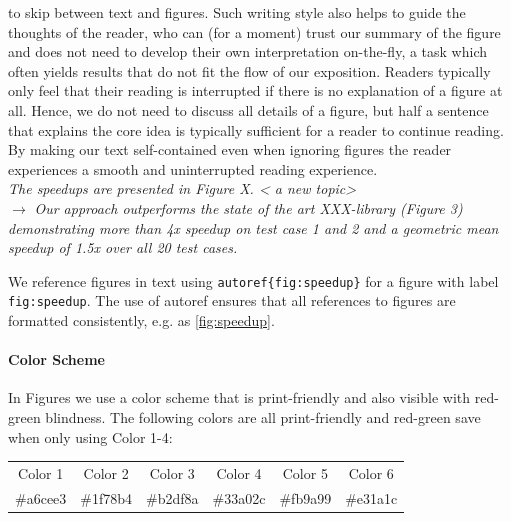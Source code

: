 \documentclass[conference]{IEEEtran}
\newenvironment{draftonly}{}{}
\begin{document}
\begin{draftonly}
\begin{description}
		to skip between text and figures. Such writing style also helps
		to guide the thoughts of the reader, who can (for a moment)
		trust our summary of the figure and does not need to develop
		their own interpretation on-the-fly, a task which often yields
		results that do not fit the flow of our exposition. Readers
		typically only feel that their reading is interrupted if there
		is no explanation of a figure at all. Hence, we do not need to
		discuss all details of a figure, but half a sentence that explains the
		core idea is typically sufficient for a reader to continue
		reading.  By making
		our text self-contained even when ignoring figures the reader
		experiences a smooth and uninterrupted reading experience.\\
		{\color{pairedTwoDarkBlue}
		\textit{The speedups are presented in Figure X. < a new topic> }}\\
		$\to$ {\color{pairedFourDarkGreen}\textit{Our approach outperforms the state of the art
		XXX-library (Figure 3) demonstrating more than 4x speedup on
		test case 1 and 2 and a geometric mean speedup of 1.5x over all
		20 test cases.}}
\end{description}
We reference figures in text using
\texttt{autoref\{fig:speedup\}} for a figure with label
\texttt{fig:speedup}.  The use of autoref ensures that all references
to figures are formatted consistently, e.g. as \autoref{fig:speedup}.

\paragraph{Color Scheme} 

In Figures we use a color scheme that is print-friendly and also visible
with red-green blindness. The following colors are all print-friendly
and red-green save when only using Color 1-4:

\medskip
{
	\small
{}

\begin{tabular}{a b d e f g}
Color 1 & Color 2 & Color 3 & Color 4 & Color 5 & Color 6\\
\#a6cee3 & \#1f78b4 & \#b2df8a & \#33a02c & \#fb9a99 & \#e31a1c
\end{tabular}
}


\end{draftonly}
\end{document}
